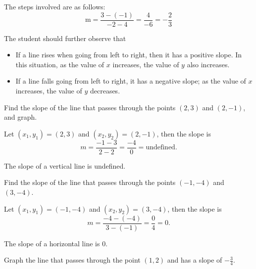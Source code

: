 The steps involved are as follows:
\[
\text{m} = \frac{3 - (-1)}{-2 - 4} = \frac{4}{-6} = -\frac{2}{3}
\]

The student should further observe that
\begin{itemize}
    \item If a line rises when going from left to right, then it has a positive slope. In this situation, as the value of $x$ increases, the value of $y$ also increases.
    \item If a line falls going from left to right, it has a negative slope; as the value of $x$ increases, the value of $y$ decreases.
\end{itemize}

\begin{example}
Find the slope of the line that passes through the points $(2, 3)$ and $(2, -1)$, and graph.
\end{example}

\begin{solution} Let $(x_1, y_1) = (2, 3)$ and $(x_2, y_2) = (2, -1)$, then the slope is
\[ m = \frac{-1 - 3}{2 - 2} = \frac{-4}{0} = \text{undefined}.\]

\end{solution}
\begin{note}
The slope of a vertical line is undefined.
\end{note}

\begin{example}
Find the slope of the line that passes through the points $(-1, -4)$ and $(3, -4)$.
\end{example}

\begin{solution} Let $(x_1, y_1) = (-1, -4)$ and $(x_2, y_2) = (3, -4)$, then the slope is
\[ m = \frac{-4 - (-4)}{3 - (-1)} = \frac{0}{4} = 0.\]

\end{solution}
\begin{note}
The slope of a horizontal line is $0$.
\end{note}

\begin{example}
Graph the line that passes through the point $(1, 2)$ and has a slope of $-\frac{3}{4}$.
\end{example}

